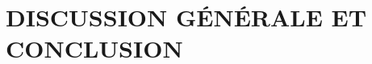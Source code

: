 \chapter*{DISCUSSION GÉNÉRALE ET CONCLUSION}

\setcounter{secnumdepth}{0}   %
\makeatletter
\renewcommand\section{\@startsection{section}{1}{\z@}%
  {12bp\@plus.2ex\@minus.2ex}{0.01bp\@plus.2ex}%
  {\normalfont\normalsize\itshape\baselineskip=\simpleinter}}
\makeatother
\setcounter{table}{0}
\renewcommand{\thetable}{D.\arabic{table}}

